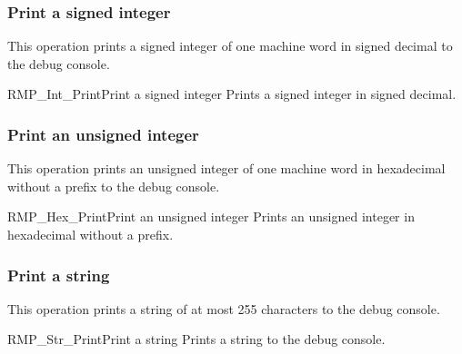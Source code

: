 \subsubsection{Print a signed integer}

This operation prints a signed integer of one machine word in signed decimal to the debug console.

\begin{apidesc}{RMP\_Int\_Print}{Print a signed integer}\label{api:RMP_Int_Print}
    Prints a signed integer in signed decimal.
    \begin{apiparams}
    \end{apiparams}
    \begin{apiret}
    \end{apiret}
\end{apidesc}

\subsubsection{Print an unsigned integer}

This operation prints an unsigned integer of one machine word in hexadecimal without a prefix to the debug console.

\begin{apidesc}{RMP\_Hex\_Print}{Print an unsigned integer}\label{api:RMP_Hex_Print}
    Prints an unsigned integer in hexadecimal without a prefix.
    \begin{apiparams}
    \end{apiparams}
    \begin{apiret}
    \end{apiret}
\end{apidesc}

\subsubsection{Print a string}

This operation prints a string of at most 255 characters to the debug console.

\begin{apidesc}{RMP\_Str\_Print}{Print a string}\label{api:RMP_Str_Print}
    Prints a string to the debug console.
    \begin{apiparams}
    \end{apiparams}
    \begin{apiret}
    \end{apiret}
\end{apidesc}

